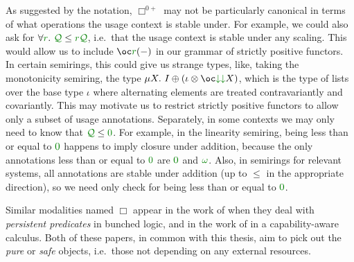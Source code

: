 As suggested by the notation, $\Box^{0{+}}$ may not be particularly canonical in
terms of what operations the usage context is stable under.
For example, we could also ask for $\forall \gr r.~\grQ \leq \gr r\grQ$, i.e.\
that the usage context is stable under any scaling.
This would allow us to include $\oc\gr r(-)$ in our grammar of strictly positive
functors.
In certain semirings, this could give us strange types, like, taking the
monotonicity semiring, the type
$\mu X.~I \oplus (\iota \otimes \oc\gr{\downarrow\downarrow} X)$,
which is the type of lists over the base type $\iota$ where alternating elements
are treated contravariantly and covariantly.
This may motivate us to restrict strictly positive functors to allow only a
subset of usage annotations.
Separately, in some contexts we may only need to know that $\grQ \leq \gr0$.
For example, in the linearity semiring, being less than or equal to $\gr0$
happens to imply closure under addition, because the only annotations less than
or equal to $\gr0$ are $\gr0$ and $\gr\omega$.
Also, in semirings for relevant systems, all annotations are stable under
addition (up to $\leq$ in the appropriate direction), so we need only check for
being less than or equal to $\gr0$.

Similar modalities named $\Box$ appear in the work of \citet{BB18} when they
deal with \emph{persistent predicates} in bunched logic, and in the work of
\citet{CK20} in a capability-aware calculus.
Both of these papers, in common with this thesis, aim to pick out the
\emph{pure} or \emph{safe} objects, i.e.\ those not depending on any external
resources.
